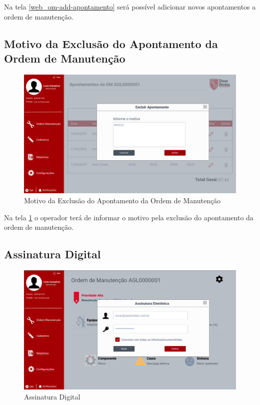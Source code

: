 {	Na tela \ref{web_om-add-apontamento} será possível adicionar novos apontamentos a ordem de manutenção.
	
	\newpage
	\subsection{Motivo da Exclusão do Apontamento da Ordem de Manutenção}
	
	\begin{figure}[htb]
		\caption{\label{web_om-excluir-apontamento-motivo}Motivo da Exclusão do Apontamento da Ordem de Manutenção}
		\begin{center}
			\includegraphics[scale=0.40]{./Figuras/web/om-excluir-apontamento-motivo.png}
		\end{center}
	\end{figure}
	
	Na tela \ref{web_om-excluir-apontamento-motivo} o operador terá de informar o motivo pela exclusão do apontamento da ordem de manutenção.
	
	\newpage
	\subsection{Assinatura Digital}
	
	\begin{figure}[htb]
		\caption{\label{web_om-assinatura}Assinatura Digital}
		\begin{center}
			\includegraphics[scale=0.40]{./Figuras/web/om-assinatura.png}
		\end{center}
	\end{figure}
	
}
